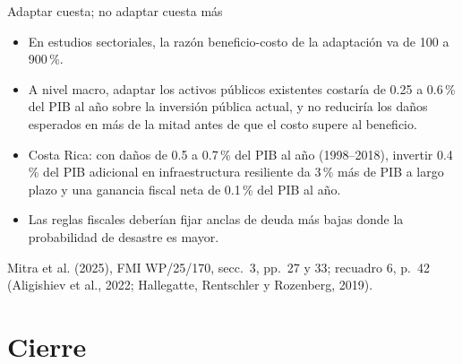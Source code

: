 \documentclass[aspectratio=169,11pt]{beamer}
\newcommand{\fuente}[1]{\par\vfill{\small\color{cGris}#1\par}}
\newcommand{\FMI}{Mitra et al. (2025), FMI WP/25/170}
\begin{document}
\begin{frame}{Adaptar cuesta; no adaptar cuesta más}
  \small
  \begin{itemize}
    \item<1-> En estudios sectoriales, la razón beneficio-costo de la adaptación va de 100 a 900\,\%.
    \item<2-> A nivel macro, adaptar los activos públicos existentes costaría de 0.25 a 0.6\,\% del PIB al año sobre la inversión pública actual, y no reduciría los daños esperados en más de la mitad antes de que el costo supere al beneficio.
    \item<3-> Costa Rica: con daños de 0.5 a 0.7\,\% del PIB al año (1998--2018), invertir 0.4\,\% del PIB adicional en infraestructura resiliente da 3\,\% más de PIB a largo plazo y una ganancia fiscal neta de 0.1\,\% del PIB al año.
    \item<4-> Las reglas fiscales deberían fijar anclas de deuda más bajas donde la probabilidad de desastre es mayor.
  \end{itemize}
  \fuente{\FMI, secc.~3, pp.~27 y 33; recuadro 6, p.~42 (Aligishiev et al., 2022; Hallegatte, Rentschler y Rozenberg, 2019).}
\end{frame}

\section{Cierre}
\end{document}
